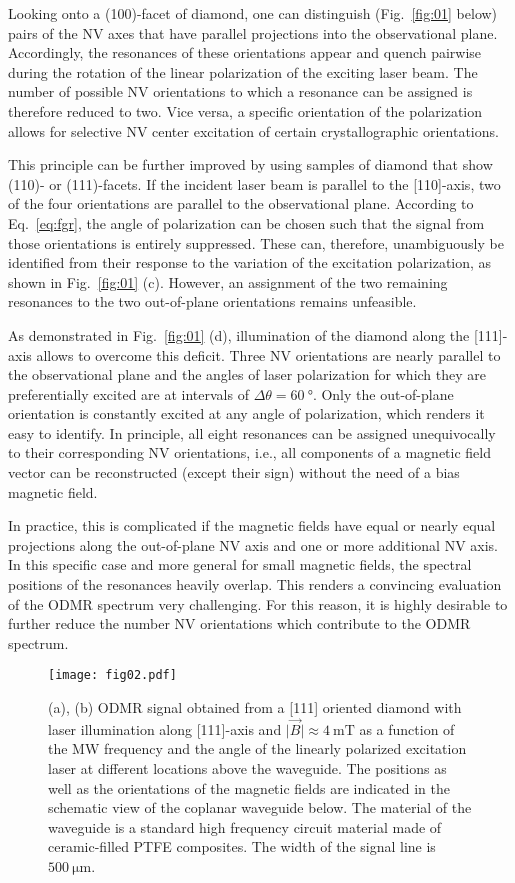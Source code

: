 \documentclass[
 reprint,
 amsmath,
 amssymb,
aps,
 prb,
showpacs
]{revtex4-1}
\begin{document}
Looking onto a (100)-facet of diamond, one can distinguish (Fig.~\ref{fig:01} below) pairs of the NV axes that have parallel projections into the observational plane. Accordingly, the resonances of these orientations appear and quench pairwise during the rotation of the linear polarization of the exciting laser beam. The number of possible NV orientations to which a resonance can be assigned is therefore reduced to two. Vice versa, a specific orientation of the polarization allows for selective NV center excitation of certain crystallographic orientations.

This principle can be further improved by using samples of diamond that show (110)- or (111)-facets. If the incident laser beam is parallel to the [110]-axis, two of the four orientations are parallel to the observational plane. According to Eq.~\ref{eq:fgr}, the angle of polarization can be chosen such that the signal from those orientations is entirely suppressed. These can, therefore, unambiguously be identified from their response to the variation of the excitation polarization, as shown in Fig.~\ref{fig:01} (c). However, an assignment of the two remaining resonances to the two out-of-plane orientations remains unfeasible.

As demonstrated in Fig.~\ref{fig:01} (d), illumination of the diamond along the [111]-axis allows to overcome this deficit. Three NV orientations are nearly parallel to the observational plane and the angles of laser polarization for which they are preferentially excited are at intervals of $\Delta \theta = \SI{60}{\degree}$. Only the out-of-plane orientation is constantly excited at any angle of polarization, which renders it easy to identify. In principle, all eight resonances can be assigned unequivocally to their corresponding NV orientations, i.e., all components of a magnetic field vector can be reconstructed (except their sign) without the need of a bias magnetic field.

In practice, this is complicated if the magnetic fields have equal or nearly equal projections along the out-of-plane NV axis and one or more additional NV axis. In this specific case and more general for small magnetic fields, the spectral positions of the resonances heavily overlap. This renders a convincing evaluation of the ODMR spectrum very challenging. For this reason, it is highly desirable to further reduce the number NV orientations which contribute to the ODMR spectrum.

\begin{figure}
	\centering
		\texttt{[image: fig02.pdf]}
	\caption{(a), (b) ODMR signal obtained from a [111] oriented diamond with laser illumination along [111]-axis and $\vert \vec{B} \vert \approx \SI{4}{\milli\tesla}$ as a function of the MW frequency and the angle of the linearly polarized excitation laser at different locations above the waveguide. The positions as well as the orientations of the magnetic fields are indicated in the schematic view of the coplanar waveguide below. The material of the waveguide is a standard high frequency circuit material made of ceramic-filled PTFE composites. The width of the signal line is $\SI{500}{\micro\meter}$.}
	\label{fig:02}
\end{figure}
\end{document}
